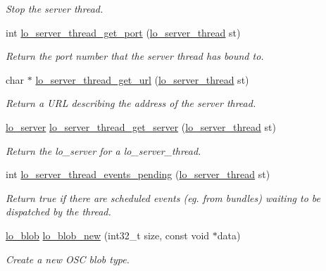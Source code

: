 \begin{DoxyCompactItemize}
\begin{DoxyCompactList}\small\item\em \-Stop the server thread. \end{DoxyCompactList}\item 
int \hyperlink{group__liblo_ga22f4b18eeac41490647ab9fe2333f933}{lo\-\_\-server\-\_\-thread\-\_\-get\-\_\-port} (\hyperlink{lo__types_8h_a09996ffb6bde21b8fb6106897b88feae}{lo\-\_\-server\-\_\-thread} st)
\begin{DoxyCompactList}\small\item\em \-Return the port number that the server thread has bound to. \end{DoxyCompactList}\item 
char $\ast$ \hyperlink{group__liblo_gac2805a7cbdd9465be4ca5101c569faf0}{lo\-\_\-server\-\_\-thread\-\_\-get\-\_\-url} (\hyperlink{lo__types_8h_a09996ffb6bde21b8fb6106897b88feae}{lo\-\_\-server\-\_\-thread} st)
\begin{DoxyCompactList}\small\item\em \-Return a \-U\-R\-L describing the address of the server thread. \end{DoxyCompactList}\item 
\hyperlink{lo__types_8h_a59067bf50cf8abb4371da6f03c9036c9}{lo\-\_\-server} \hyperlink{group__liblo_gab968d51fa6e0d4bea92e3f84f5556161}{lo\-\_\-server\-\_\-thread\-\_\-get\-\_\-server} (\hyperlink{lo__types_8h_a09996ffb6bde21b8fb6106897b88feae}{lo\-\_\-server\-\_\-thread} st)
\begin{DoxyCompactList}\small\item\em \-Return the lo\-\_\-server for a lo\-\_\-server\-\_\-thread. \end{DoxyCompactList}\item 
int \hyperlink{group__liblo_ga7bc3d8361b65e3ad112a1da956d9114e}{lo\-\_\-server\-\_\-thread\-\_\-events\-\_\-pending} (\hyperlink{lo__types_8h_a09996ffb6bde21b8fb6106897b88feae}{lo\-\_\-server\-\_\-thread} st)
\begin{DoxyCompactList}\small\item\em \-Return true if there are scheduled events (eg. from bundles) waiting to be dispatched by the thread. \end{DoxyCompactList}\item 
\hyperlink{lo__types_8h_a8e780f8c09e3e4dd737fe249f11d16fc}{lo\-\_\-blob} \hyperlink{group__liblo_gaffb2348c70cb0e1214fd50bdc7574c39}{lo\-\_\-blob\-\_\-new} (int32\-\_\-t size, const void $\ast$data)
\begin{DoxyCompactList}\small\item\em \-Create a new \-O\-S\-C blob type. \end{DoxyCompactList}\item 

\end{DoxyCompactItemize}
